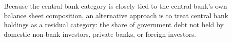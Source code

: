 \documentclass[\latexroot/\projectname]{subfiles}
\begin{document}
Because the central bank category is closely tied to the central bank's own balance sheet composition, an alternative approach is to treat central bank holdings as a residual category: the share of government debt not held by domestic non-bank investors, private banks, or foreign investors.

\smartbib
\end{document}
